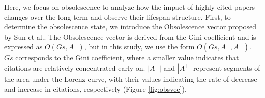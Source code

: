 Here, we focus on obsolescence to analyze how the impact of highly cited papers changes over the long term and observe their lifespan structure.
First, to determine the obsolescence state, we introduce the Obsolescence vector proposed by Sun et al.\cite{SUn1}.
The Obsolescence vector is derived from the Gini coefficient and is expressed as $O(Gs,A^-)$, but in this study, we use the form $O(Gs,A^-,A^+)$. $Gs$ corresponds to the Gini coefficient, where a smaller value indicates that citations are relatively concentrated early on. $|A^-|$ and $|A^+|$ represent segments of the area under the Lorenz curve, with their values indicating the rate of decrease and increase in citations, respectively (Figure \ref{fig:obsvec}).

